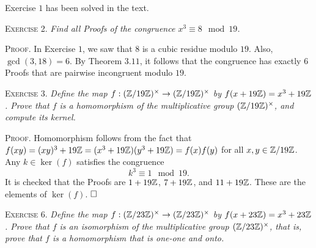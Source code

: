\documentclass[11pt, leqno]{article}
\newcommand{\done}{\ensuremath{\hfill\square}}
\begin{document}
%


Exercise $1$ has been solved in the text.

\textsc{Exercise 2}. \emph{Find all Proofs of the congruence $x^3\equiv 8 \mod 19$.}

\textsc{Proof}. In Exercise $1$, we saw that $8$ is a cubic residue modulo $19$. Also, $\gcd(3,18) = 6$. By Theorem $3.11$, it follows that the congruence has exactly $6$ Proofs that are pairwise incongruent modulo $19$.

\textsc{Exercise 3}. \emph{Define the map $f:(\mathbb{Z}/19\mathbb{Z})^{\times} \to (\mathbb{Z}/19\mathbb{Z})^{\times}$ by $f(x+19\mathbb{Z}) = x^3+19\mathbb{Z}$. Prove that $f$ is a homomorphism of the multiplicative group $(\mathbb{Z}/19\mathbb{Z})^{\times}$, and compute its kernel.}

\textsc{Proof}. Homomorphism follows from the fact that $f(xy) = (xy)^3 + 19\mathbb{Z} = (x^3+19\mathbb{Z})(y^3+19\mathbb{Z}) = f(x)f(y)$ for all $x,y \in \mathbb{Z}/19\mathbb{Z}$. Any $k\in \ker(f)$ satisfies the congruence
\begin{displaymath}
k^3 \equiv 1 \mod 19.
\end{displaymath}
It is checked that the Proofs are $1+19\mathbb{Z}$, $7+19\mathbb{Z}$, and $11+19\mathbb{Z}$. These are the elements of $\ker(f)$. \done

\textsc{Exercise 6}. \emph{Define the map $f: (\mathbb{Z}/23\mathbb{Z})^{\times} \to (\mathbb{Z}/23\mathbb{Z})^{\times}$ by $f(x+ 23\mathbb{Z}) = x^3 + 23\mathbb{Z}$. Prove that $f$ is an isomorphism of the multiplicative group $(\mathbb{Z}/23\mathbb{Z})^{\times}$, that is, prove that $f$ is a homomorphism that is one-one and onto.}
\end{document}

